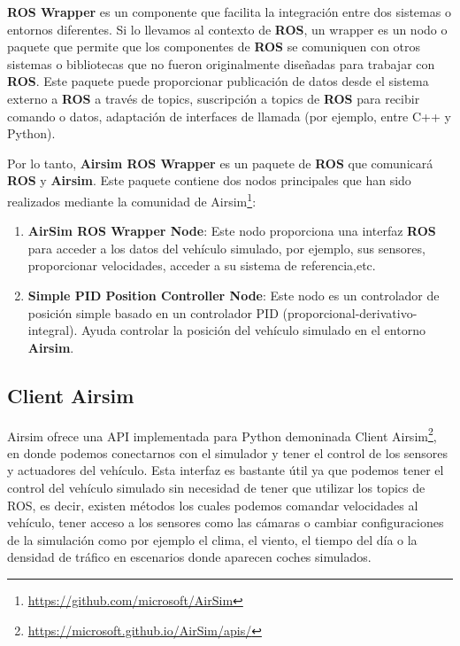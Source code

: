 \textbf{ROS Wrapper} es un componente que facilita la integración entre dos sistemas o entornos diferentes. Si lo llevamos al contexto de \textbf{ROS}, un wrapper es un nodo o paquete 
que permite que los componentes de \textbf{ROS} se comuniquen con otros sistemas o bibliotecas que no fueron originalmente diseñadas para trabajar con \textbf{ROS}. Este paquete 
puede proporcionar publicación de datos desde el sistema externo a \textbf{ROS} a través de topics, suscripción a topics de \textbf{ROS} para recibir comando o datos, adaptación 
de interfaces de llamada (por ejemplo, entre C++ y Python). \newline

Por lo tanto, \textbf{Airsim ROS Wrapper} es un paquete de \textbf{ROS} que comunicará \textbf{ROS} y \textbf{Airsim}. Este paquete contiene dos nodos principales 
que han sido realizados mediante la comunidad de Airsim\footnote{\url{https://github.com/microsoft/AirSim}}:
\begin{enumerate}
  \item \textbf{AirSim ROS Wrapper Node}: Este nodo proporciona una interfaz \textbf{ROS} para acceder a los datos del vehículo simulado, por ejemplo, sus sensores, proporcionar velocidades, acceder a su sistema de referencia,etc. 
  \item \textbf{Simple PID Position Controller Node}: Este nodo es un controlador de posición simple basado en un controlador PID (proporcional-derivativo-integral). Ayuda controlar la posición del vehículo 
  simulado en el entorno \textbf{Airsim}.
\end{enumerate}

\subsection{Client Airsim}
\label{sec:Client Airsim}

Airsim ofrece una API implementada para Python demoninada Client Airsim\footnote{\url{https://microsoft.github.io/AirSim/apis/}}, en donde podemos conectarnos con el simulador y tener el control de los sensores y actuadores del vehículo. 
Esta interfaz es bastante útil ya que podemos tener el control del vehículo simulado sin necesidad de tener que utilizar los topics de ROS, es decir, existen métodos los cuales
podemos comandar velocidades al vehículo, tener acceso a los sensores como las cámaras o cambiar configuraciones de la simulación como por ejemplo el clima, el viento, el tiempo del día
o la densidad de tráfico en escenarios donde aparecen coches simulados. \newline

